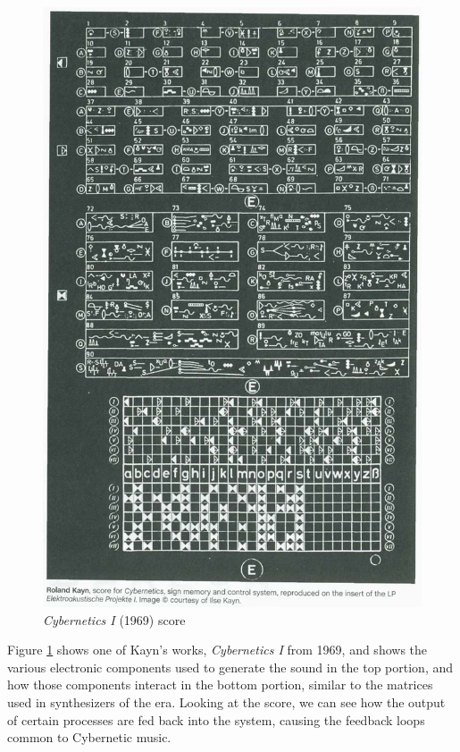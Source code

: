 \begin{figure}
    \centering %
    \includegraphics[scale=0.45]{diagrams/kayn_cybernetics.jpeg}
    \caption{\textit{Cybernetics I} (1969) score}
    \label{cyberneticsScore}
\end{figure}


Figure \ref{cyberneticsScore} shows one of Kayn's works, \textit{Cybernetics I} from 1969, and shows the various electronic components used to generate the sound in the top portion, and how those components interact in the bottom portion, similar to the matrices used in synthesizers of the era. Looking at the score, we can see how the output of certain processes are fed back into the system, causing the feedback loops common to Cybernetic music.


